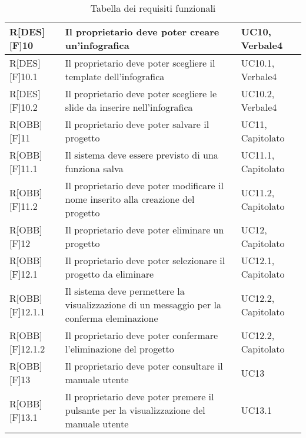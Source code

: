 	\begin{table}[h]
		\begin{tabular}{|p{}|p{}|p{}|}
			\midrule

			R[DES][F]10 & Il proprietario deve poter creare un'\gls{infografica} & UC10, Verbale4 \\ \midrule
			R[DES][F]10.1 & Il proprietario deve poter scegliere il \gls{template} dell'\gls{infografica} & UC10.1, Verbale4 \\ \midrule
			R[DES][F]10.2 & Il proprietario deve poter scegliere le \gls{slide} da inserire nell'\gls{infografica} & UC10.2, Verbale4 \\ \midrule
			R[OBB][F]11 & Il proprietario deve poter salvare il progetto & UC11, Capitolato  \\ \midrule
			R[OBB][F]11.1 & Il sistema deve essere previsto di una funziona salva & UC11.1, Capitolato \\ \midrule
			R[OBB][F]11.2 & Il proprietario deve poter modificare il nome inserito alla creazione del progetto & UC11.2, Capitolato \\ \midrule
			R[OBB][F]12 & Il proprietario deve poter eliminare un progetto & UC12, Capitolato \\ \midrule
			R[OBB][F]12.1 & Il proprietario deve poter selezionare il progetto da eliminare & UC12.1, Capitolato \\ \midrule
			R[OBB][F]12.1.1 & Il sistema deve permettere la visualizzazione di un messaggio per la conferma eleminazione & UC12.2, Capitolato \\ \midrule
			R[OBB][F]12.1.2 & Il proprietario deve poter confermare l'eliminazione del progetto  & UC12.2, Capitolato \\ \midrule
			R[OBB][F]13 & Il proprietario deve poter consultare il manuale utente & UC13 \\ \midrule
			R[OBB][F]13.1 & Il proprietario deve poter premere il pulsante per la visualizzazione del manuale utente & UC13.1 \\
			
			\bottomrule

		\end{tabular}
		\caption{Tabella dei requisiti funzionali}
	\end{table}
	\newpage
